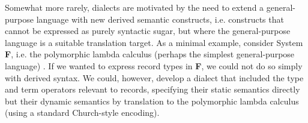 Somewhat more rarely, dialects are motivated by the need to extend a general-purpose language with new derived semantic constructs, i.e. constructs that cannot be expressed as purely syntactic sugar, but where the general-purpose language is a suitable translation target. As a minimal example, consider System \textbf{F}, i.e. the polymorphic lambda calculus (perhaps the simplest general-purpose language) \cite{pfpl}. If we wanted to express record types in \textbf{F}, we could not do so simply with derived syntax. We could, however, develop a dialect that included the type and term operators relevant to records, specifying their static semantics directly but their dynamic semantics by translation to the polymorphic lambda calculus (using a standard Church-style encoding). %



